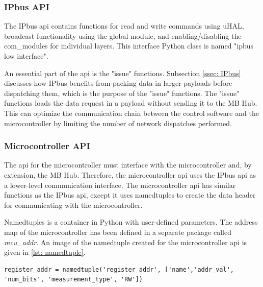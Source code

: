 \documentclass[main.tex]{subfiles}
\begin{document}
\subsubsection{IPbus API}
The IPbus \gls{api} contains functions for read and write commands using uHAL, broadcast functionality using the global module, and enabling/disabling the com\_modules for individual layers. This interface Python class is named "ipbus low interface".

An essential part of the \gls{api} is the "issue" functions. Subsection \ref{ssec: IPbus} discusses how IPbus benefits from packing data in larger payloads before dispatching them, which is the purpose of the "issue" functions. The "issue" functions loads the data request in a payload without sending it to the MB Hub. This can optimize the communication chain between the control software and the microcontroller by limiting the number of network dispatches performed.

\subsubsection{Microcontroller API}

The \gls{api} for the microcontroller must interface with the microcontroller and, by extension, the MB Hub. Therefore, the microcontroller \gls{api} uses the IPbus \gls{api} as a lower-level communication interface. The microcontroller \gls{api} has similar functions as the IPbus \gls{api}, except it uses namedtuples to create the data header for communicating with the microcontroller.

Namedtuples is a container in Python with user-defined parameters. The address map of the microcontroller has been defined in a separate package called \textit{mcu\_addr}. An image of the namedtuple created for the microcontroller \gls{api} is given in \autoref{lst: namedtuple}.



\begin{lstlisting}[caption={Code showing the construction of the namedtuple in the "mcu\_addr" package.},captionpos=b, label=lst: namedtuple]
register_addr = namedtuple('register_addr', ['name','addr_val', 'num_bits', 'measurement_type', 'RW'])
    \end{lstlisting}
\end{document}
